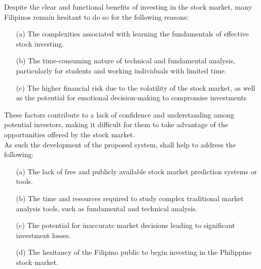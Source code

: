 Despite the clear and functional benefits of investing in the stock market, 
many Filipinos remain hesitant to do so for the following reasons:
\begin{itemize}
  \item[(a)] The complexities associated with learning the fundamentals 
  of effective stock investing.
  \item[(b)] The time-consuming nature of technical and fundamental 
  analysis, particularly for students and working individuals with limited time.
  \item[(c)] The higher financial risk due to the volatility of the stock market, 
  as well as the potential for emotional decision-making to compromise investments
\end{itemize}

These factors contribute to a lack of confidence and understanding 
among potential investors, making it difficult for them to take advantage of the 
opportunities offered by the stock market.
\hfill \\

As such the development of the proposed system, shall help to address the following:
\begin{itemize}
  \item[(a)] The lack of free and publicly available 
  stock market prediction systems or tools.
  \item[(b)] The time and resources required to study complex traditional 
  market analysis tools, such as fundamental and technical analysis.
  \item[(c)] The potential for inaccurate market decisions
  leading to significant investment losses.
  \item[(d)] The hesitancy of the Filipino public to begin 
  investing in the Philippine stock market.
\end{itemize}